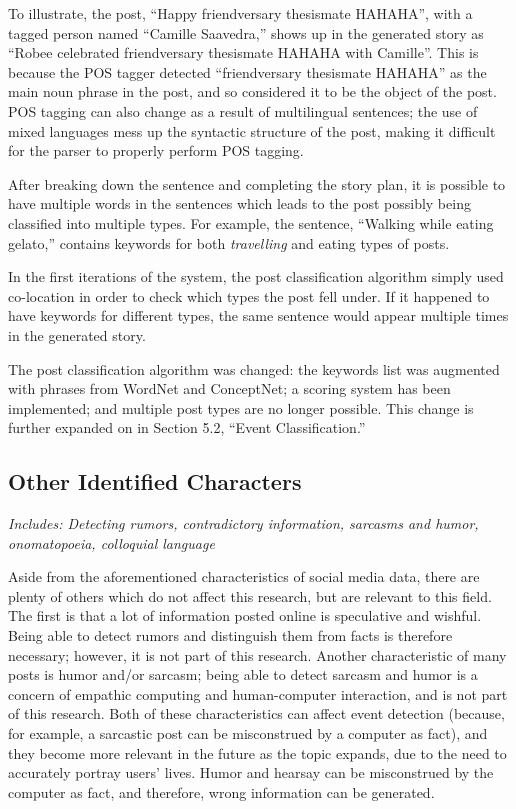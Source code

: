 To illustrate, the post, ``Happy friendversary thesismate HAHAHA”, with a tagged person named ``Camille Saavedra,” shows up in the generated story as ``Robee celebrated friendversary thesismate HAHAHA with Camille”. This is because the POS tagger detected ``friendversary thesismate HAHAHA” as the main noun phrase in the post, and so considered it to be the object of the post. POS tagging can also change as a result of multilingual sentences; the use of mixed languages mess up the syntactic structure of the post, making it difficult for the parser to properly perform POS tagging.

After breaking down the sentence and completing the story plan, it is possible to have multiple words in the sentences which leads to the post possibly being classified into multiple types. For example, the sentence, ``Walking while eating gelato,” contains keywords for both \textit{travelling} and eating types of posts.

In the first iterations of the system, the post classification algorithm simply used co-location in order to check which types the post fell under. If it happened to have keywords for different types, the same sentence would appear multiple times in the generated story.

The post classification algorithm was changed: the keywords list was augmented with phrases from WordNet and ConceptNet; a scoring system has been implemented; and multiple post types are no longer possible. This change is further expanded on in Section 5.2, ``Event Classification.”

\subsection{Other Identified Characters}
\textit{Includes: Detecting rumors, contradictory information, sarcasms and humor, onomatopoeia, colloquial language}

Aside from the aforementioned characteristics of social media data, there are plenty of others which do not affect this research, but are relevant to this field. The first is that a lot of information posted online is speculative and wishful. Being able to detect rumors and distinguish them from facts is therefore necessary; however, it is not part of this research. Another characteristic of many posts is humor and/or sarcasm; being able to detect sarcasm and humor is a concern of empathic computing and human-computer interaction, and is not part of this research. Both of these characteristics can affect event detection (because, for example, a sarcastic post can be misconstrued by a computer as fact), and they become more relevant in the future as the topic expands, due to the need to accurately portray users’ lives. Humor and hearsay can be misconstrued by the computer as fact, and therefore, wrong information can be generated.


